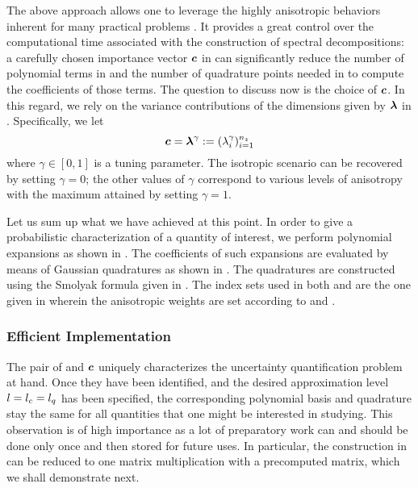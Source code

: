 The above approach allows one to leverage the highly anisotropic behaviors
inherent for many practical problems \cite{nobile2008}. It provides a great
control over the computational time associated with the construction of spectral
decompositions: a carefully chosen importance vector $\boldsymbol{c}$ in
 can significantly reduce the number of
polynomial terms in  and the number of quadrature
points needed in  to compute the coefficients of
those terms. The question to discuss now is the choice of $\boldsymbol{c}$. In this
regard, we rely on the variance contributions of the dimensions given by
$\boldsymbol{\lambda}$ in . Specifically, we let
\begin{equation} \elab{dimension-anisotropy}
  \v{c} = \v{\lambda}^\gamma := (\lambda_i^\gamma)_{i = 1}^\nz
\end{equation}
where $\gamma \in [0, 1]$ is a tuning parameter. The isotropic scenario can be
recovered by setting $\gamma = 0$; the other values of $\gamma$ correspond to
various levels of anisotropy with the maximum attained by setting $\gamma = 1$.

Let us sum up what we have achieved at this point. In order to give a
probabilistic characterization of a quantity of interest, we perform polynomial
expansions as shown in . The coefficients of such
expansions are evaluated by means of Gaussian quadratures as shown in
. The quadratures are constructed using the Smolyak
formula given in . The index sets used in both
 and  are the one given
in  wherein the anisotropic weights are
set according to  and .

\subsubsection{Efficient Implementation}

The pair of \vz and $\boldsymbol{c}$ uniquely characterizes the uncertainty
quantification problem at hand. Once they have been identified, and the desired
approximation level $l = {l_{c}} = {l_{q}}$ has been specified, the corresponding
polynomial basis and quadrature stay the same for all quantities that one might
be interested in studying. This observation is of high importance as a lot of
preparatory work can and should be done only once and then stored for future
uses. In particular, the construction in  can be
reduced to one matrix multiplication with a precomputed matrix, which we shall
demonstrate next.

